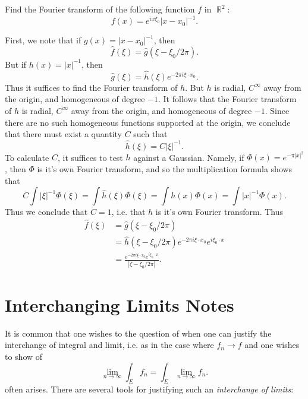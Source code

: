 \documentclass[answers]{exam}
\DeclareMathOperator{\RR}{\mathbb{R}}
\begin{document}
\begin{questions}
\question Find the Fourier transform of the following function $f$ in $\RR^2$:
%
\[ f(x) = e^{i x \xi_0} |x - x_0|^{-1}. \]
\begin{solution}
	First, we note that if $g(x) = |x - x_0|^{-1}$, then
	\[ \widehat{f}(\xi) = \widehat{g}(\xi - \xi_0 / 2 \pi). \]
	But if $h(x) = |x|^{-1}$, then
	\[ \widehat{g}(\xi) = \widehat{h}(\xi) e^{-2 \pi i \xi \cdot x_0}. \]
	Thus it suffices to find the Fourier transform of $h$. But $h$ is radial, $C^\infty$ away from the origin, and homogeneous of degree $-1$. It follows that the Fourier transform of $h$ is radial, $C^\infty$ away from the origin, and homogeneous of degree $-1$. Since there are no such homogeneous functions supported at the origin, we conclude that there must exist a quantity $C$ such that
	\[ \widehat{h}(\xi) = C |\xi|^{-1}. \]
	To calculate $C$, it suffices to test $h$ against a Gaussian. Namely, if $\Phi(x) = e^{- \pi |x|^2}$, then $\Phi$ is it's own Fourier transform, and so the multiplication formula shows that
	\[ C \int |\xi|^{-1} \Phi(\xi) = \int \widehat{h}(\xi) \Phi(\xi) = \int h(x) \Phi(x) = \int |x|^{-1} \Phi(x). \]
	Thus we conclude that $C = 1$, i.e. that $h$ is it's own Fourier transform. Thus
	\begin{align*}
		\widehat{f}(\xi) &= \widehat{g}(\xi - \xi_0 / 2 \pi)\\
		&= \widehat{h}(\xi - \xi_0 / 2\pi) e^{-2 \pi i \xi \cdot x_0} e^{i \xi_0 \cdot x}\\
		&= \frac{e^{-2 \pi i \xi \cdot x_0} e^{i \xi_0 \cdot x}}{|\xi - \xi_0 / 2\pi|}.
	\end{align*}
\end{solution}







\newpage
\section{Interchanging Limits Notes}

It is common that one wishes to the question of when one can justify the interchange of integral and limit, i.e. as in the case where $f_n \to f$ and one wishes to show of 
\begin{equation*}
  \lim_{n\to\infty} \int_E f_{n} = \int_E \lim_{n\to\infty}  f_{n}.
\end{equation*}
often arises. There are several tools for justifying such an \textit{interchange of limits}:


\end{questions}
\end{document}
